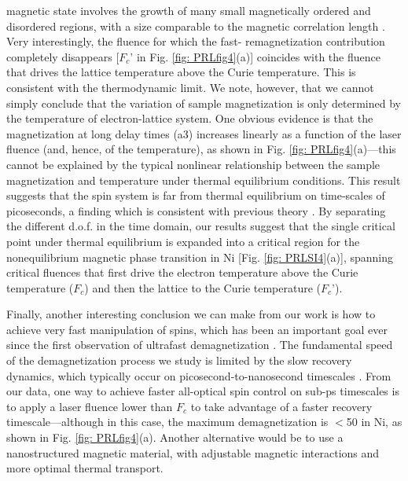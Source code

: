 magnetic state involves the growth of many small magnetically ordered and disordered regions, with a size comparable to the magnetic correlation length \cite{Kazantseva2008}. Very interestingly, the fluence for which the fast- remagnetization contribution completely disappears [$F_c$' in Fig. \ref{fig: PRLfig4}(a)] coincides with the fluence that drives the lattice temperature above the Curie temperature. This is consistent with the thermodynamic limit. We note, however, that we cannot simply conclude that the variation of sample magnetization is only determined by the temperature of electron-lattice system. One obvious evidence is that the magnetization at long delay times (a3) increases linearly as a function of the laser fluence (and, hence, of the temperature), as shown in Fig. \ref{fig: PRLfig4}(a)—this cannot be explained by the typical nonlinear relationship between the sample magnetization and temperature under thermal equilibrium conditions. This result suggests that the spin system is far from thermal equilibrium on time-scales of picoseconds, a finding which is consistent with previous theory \cite{Kazantseva2008}. By separating the different d.o.f. in the time domain, our results suggest that the single critical point under thermal equilibrium is expanded into a critical region for the nonequilibrium magnetic phase transition in Ni [Fig. \ref{fig: PRLSI4}(a)], spanning critical fluences that first drive the electron temperature above the Curie temperature ($F_c$) and then the lattice to the Curie temperature ($F_c$').

Finally, another interesting conclusion we can make from our work is how to achieve very fast manipulation of spins, which has been an important goal ever since the first observation of ultrafast demagnetization \cite{E.BeaupaireJ-CMerleA.Daunois1996}. The fundamental speed of the demagnetization process we study is limited by the slow recovery dynamics, which typically occur on picosecond-to-nanosecond timescales \cite{E.BeaupaireJ-CMerleA.Daunois1996, Carley2012, Carpene2015, Eich2017, Koopmans2005,La-O-Vorakiat2009, Mathias2012, Rhie2003, Roth2012, Stamm2007,Turgut2016}. From our data, one way to achieve faster all-optical spin control on sub-ps timescales is to apply a laser fluence lower than $F_c$ to take advantage of a faster recovery timescale—although in this case, the maximum demagnetization is $<$50 in Ni, as shown in Fig. \ref{fig: PRLfig4}(a). Another alternative would be to use a nanostructured magnetic material, with adjustable magnetic interactions and more optimal thermal transport.

